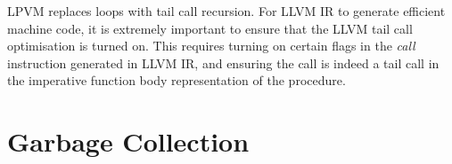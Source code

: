 LPVM replaces loops with tail call recursion. For LLVM IR to generate efficient
machine code, it is extremely important to ensure that the LLVM tail call
optimisation is turned on. This requires turning on certain flags in the
\textit{call} instruction generated in LLVM IR, and ensuring the call is indeed
a tail call in the imperative function body representation of the procedure.


\section{Garbage Collection}



